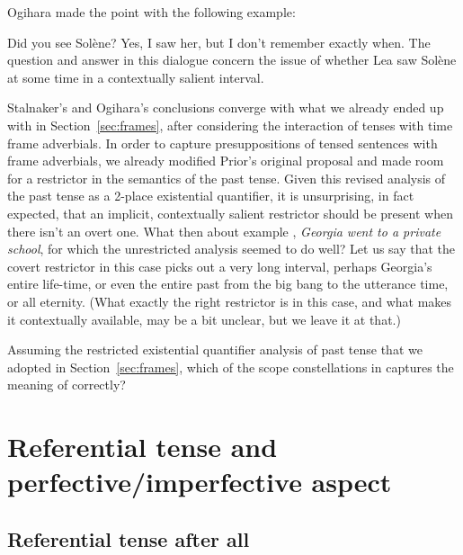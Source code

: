 Ogihara made the point with the following example:

\pex[labelformat=A:,samplelabel=Patricia]
\a[label=Patricia] Did you see Solène?
\a[label=Lea] Yes, I saw her, but I don’t remember exactly when.
\xe
%
The question and answer in this dialogue concern the issue of whether Lea saw
Solène at some time in a contextually salient interval.

Stalnaker's and Ogihara's conclusions converge with what we already ended up
with in Section~\ref{sec:frames}, after considering the interaction of tenses
with time frame adverbials. In order to capture presuppositions of tensed
sentences with frame adverbials, we already modified Prior's original proposal
and made room for a restrictor in the semantics of the past tense. Given this
revised analysis of the past tense as a 2-place existential quantifier, it is
unsurprising, in fact expected, that an implicit, contextually salient
restrictor should be present when there isn't an overt one. What then about
example , \emph{Georgia went to a private school}, for which the
unrestricted analysis seemed to do well? Let us say that the covert restrictor
in this case picks out a very long interval, perhaps Georgia's entire life-time,
or even the entire past from the big bang to the utterance time, or all
eternity. (What exactly the right restrictor is in this case, and what makes it
contextually available, may be a bit unclear, but we leave it at that.)

\begin{exercise}
  Assuming the restricted existential quantifier analysis of past tense that we
  adopted in Section~\ref{sec:frames}, which of the scope constellations in
  \LLast captures the meaning of  correctly?
\end{exercise}

\section{Referential tense and perfective/imperfective aspect}
\label{sec:aspect}

\subsection{Referential tense after all}
\label{subsec:after-all}

